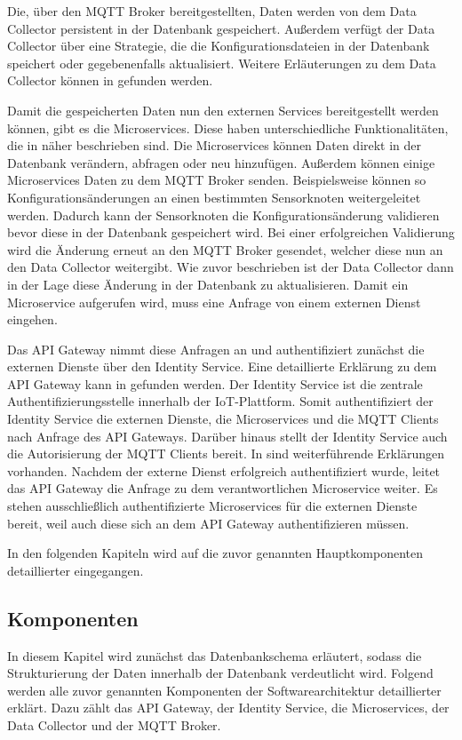 Die, über den MQTT Broker bereitgestellten, Daten werden von dem Data Collector persistent in der Datenbank gespeichert.
Außerdem verfügt der Data Collector über eine Strategie, die die Konfigurationsdateien in der Datenbank speichert oder gegebenenfalls aktualisiert.
Weitere Erläuterungen zu dem Data Collector können in  gefunden werden. 


Damit die gespeicherten Daten nun den externen Services bereitgestellt werden können, gibt es die Microservices.
Diese haben unterschiedliche Funktionalitäten, die in  näher beschrieben sind.
Die Microservices können Daten direkt in der Datenbank verändern, abfragen oder neu hinzufügen.
Außerdem können einige Microservices Daten zu dem MQTT Broker senden.
Beispielsweise können so Konfigurationsänderungen an einen bestimmten Sensorknoten weitergeleitet werden.
Dadurch kann der Sensorknoten die Konfigurationsänderung validieren bevor diese in der Datenbank gespeichert wird.
Bei einer erfolgreichen Validierung wird die Änderung erneut an den MQTT Broker gesendet, welcher diese nun an den Data Collector weitergibt.
Wie zuvor beschrieben ist der Data Collector dann in der Lage diese Änderung in der Datenbank zu aktualisieren. 
Damit ein Microservice aufgerufen wird, muss eine Anfrage von einem externen Dienst eingehen. 


Das API Gateway nimmt diese Anfragen an und authentifiziert zunächst die externen Dienste über den Identity Service.
Eine detaillierte Erklärung zu dem API Gateway kann in  gefunden werden. \newline
Der Identity Service ist die zentrale Authentifizierungsstelle innerhalb der IoT-Plattform.
Somit authentifiziert der Identity Service die externen Dienste, die Microservices und die MQTT Clients nach Anfrage des API Gateways.
Darüber hinaus stellt der Identity Service auch die Autorisierung der MQTT Clients bereit.
In  sind weiterführende Erklärungen vorhanden.
Nachdem der externe Dienst erfolgreich authentifiziert wurde, leitet das API Gateway die Anfrage zu dem verantwortlichen Microservice weiter.
Es stehen ausschließlich authentifizierte Microservices für die externen Dienste bereit, weil auch diese sich an dem API Gateway authentifizieren müssen.


In den folgenden Kapiteln wird auf die zuvor genannten Hauptkomponenten detaillierter eingegangen.

\FloatBarrier

\subsection{Komponenten}
\label{sec:arch:iot:komponenteniot}
In diesem Kapitel wird zunächst das Datenbankschema erläutert, sodass die Strukturierung der Daten innerhalb der Datenbank verdeutlicht wird. Folgend werden alle zuvor genannten Komponenten der Softwarearchitektur detaillierter erklärt. Dazu zählt das API Gateway, der Identity Service, die Microservices, der Data Collector und der MQTT Broker.
